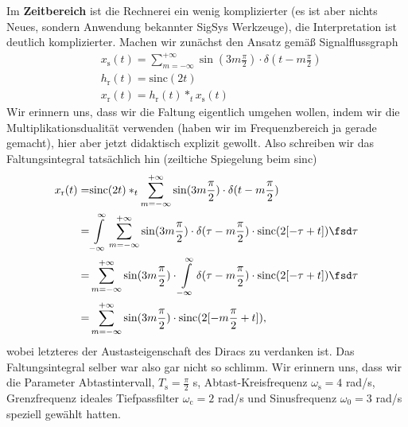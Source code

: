 \begin{Loesung}
Im \textbf{Zeitbereich} ist die Rechnerei ein wenig komplizierter (es ist aber
nichts Neues, sondern Anwendung bekannter SigSys Werkzeuge), die Interpretation
ist deutlich komplizierter.
Machen wir zunächst den Ansatz gemäß Signalflussgraph
\begin{align}
&x_\mathrm{s}(t) =
\sum_{m=-\infty}^{+\infty} \sin(3 m \frac{\pi}{2}) \cdot \delta(t-m \frac{\pi}{2})\\
&h_\mathrm{r}(t) = \mathrm{sinc}(2 t)\\
&x_\mathrm{r}(t) = h_\mathrm{r}(t) \ast_t x_\mathrm{s}(t)
\end{align}
Wir erinnern uns, dass wir die Faltung eigentlich umgehen wollen, indem
wir die Multiplikationsdualität verwenden (haben wir im Frequenzbereich
ja gerade gemacht), hier aber jetzt didaktisch explizit gewollt.
Also schreiben wir das Faltungsintegral tatsächlich hin (zeiltiche Spiegelung beim sinc)
\begin{align}
x_\mathrm{r}(t) =&
\mathrm{sinc}(2 t)
\ast_t
\sum_{m=-\infty}^{+\infty} \sin(3 m \frac{\pi}{2}) \cdot \delta(t-m \frac{\pi}{2})\\
=&
\int\limits_{-\infty}^{\infty}
\sum_{m=-\infty}^{+\infty} \sin(3 m \frac{\pi}{2}) \cdot \delta(\tau-m \frac{\pi}{2})
\cdot \mathrm{sinc}(2 [-\tau + t]) \fsd \tau\\
=&
\sum_{m=-\infty}^{+\infty} \sin(3 m \frac{\pi}{2}) \cdot
\int\limits_{-\infty}^{\infty} \delta(\tau-m \frac{\pi}{2})
\cdot \mathrm{sinc}(2 [-\tau + t]) \fsd \tau\\
=&
\sum_{m=-\infty}^{+\infty} \sin(3 m \frac{\pi}{2}) \cdot \mathrm{sinc}(2 [-m \frac{\pi}{2} + t]),
\label{eq:EF235EE3D8_SincSpecialResult}
\end{align}
wobei letzteres der Austasteigenschaft des Diracs zu verdanken ist.
Das Faltungsintegral selber war also gar nicht so schlimm.
%
Wir erinnern uns, dass wir die Parameter Abtastintervall, $T_\mathrm{s}=\frac{\pi}{2}$ s,
Abtast-Kreisfrequenz $\omega_\mathrm{s}=4$  rad/s, Grenzfrequenz ideales
Tiefpassfilter $\omega_\mathrm{c} = 2$ rad/s und Sinusfrequenz $\omega_0=3$ rad/s
speziell gewählt hatten.
\end{Loesung}
%
%

